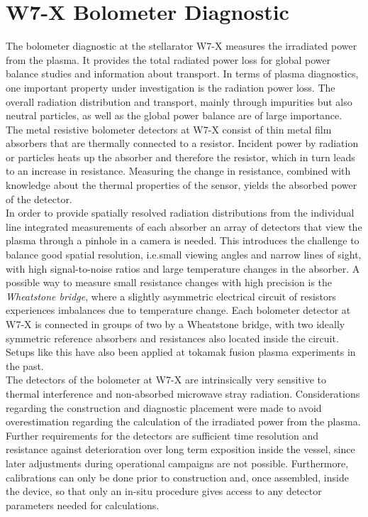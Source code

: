     \section{W7-X Bolometer Diagnostic}\label{sec:w7xbolometer}%
%
        The bolometer diagnostic at the stellarator W7-X measures the irradiated power from the plasma. It provides the total radiated power loss for global power balance studies and information about transport. In terms of plasma diagnostics, one important property under investigation is the radiation power loss. The overall radiation distribution and transport, mainly through impurities but also neutral particles, as well as the global power balance are of large importance.\\%
        The metal resistive bolometer detectors at W7-X consist of thin metal film absorbers that are thermally connected to a resistor. Incident power by radiation or particles heats up the absorber and therefore the resistor, which in turn leads to an increase in resistance. Measuring the change in resistance, combined with knowledge about the thermal properties of the sensor, yields the absorbed power of the detector.\\%
        In order to provide spatially resolved radiation distributions from the individual line integrated measurements of each absorber an array of detectors that view the plasma through a pinhole in a camera is needed. This introduces the challenge to balance good spatial resolution, i.e.small viewing angles and narrow lines of sight, with high signal-to-noise ratios and large temperature changes in the absorber. A possible way to measure small resistance changes with high precision is the \textit{Wheatstone bridge}, where a slightly asymmetric electrical circuit of resistors experiences imbalances due to temperature change\cite{Horowitz1989}. Each bolometer detector at W7-X is connected in groups of two by a Wheatstone bridge, with two ideally symmetric reference absorbers and resistances also located inside the circuit. Setups like this have also been applied at tokamak fusion plasma experiments in the past\cite{Mast1991}.\\%
        The detectors of the bolometer at W7-X are intrinsically very sensitive to thermal interference and non-absorbed microwave stray radiation\cite{Zhang2010}. Considerations regarding the construction and diagnostic placement were made to avoid overestimation regarding the calculation of the irradiated power from the plasma. Further requirements for the detectors are sufficient time resolution and resistance against deterioration over long term exposition inside the vessel, since later adjustments during operational campaigns are not possible. Furthermore, calibrations can only be done prior to construction and, once assembled, inside the device, so that only an in-situ procedure gives access to any detector parameters needed for calculations.\\%
